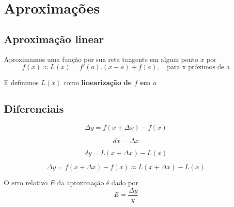 \chapter{Aproximações}

\section{Aproximação linear}

Aproximamos uma função por sua reta tangente em algum ponto \(x\) por
\begin{equation}
    f(x) \approx L(x) = f'(a).(x-a) + f(a), \quad \text{para x próximos de a}    
\end{equation}
\begin{definition}
    E definimos \(L(x)\) como \textbf{linearização de \(f\) em \(a\)}
\end{definition}

\section{Diferenciais}

\begin{equation}
    \Delta y = f(x + \Delta x) - f(x)
\end{equation}

\begin{definition}[Diferencial dx]
    \begin{equation}
        dx = \Delta x
    \end{equation}
    
\end{definition}

\begin{definition}[Diferencial dy]
    \begin{equation}
        dy = L(x + \Delta x) - L(x)
    \end{equation}
    
\end{definition}

\begin{equation}
    \Delta y = f(x + \Delta x) - f(x) \approx L(x + \Delta x) - L(x)
\end{equation}

\begin{definition}
    O erro relativo \(E\) da aproximação é dado por
    \begin{equation}
        E = \frac{\Delta y}{y}    
    \end{equation}
\end{definition}

